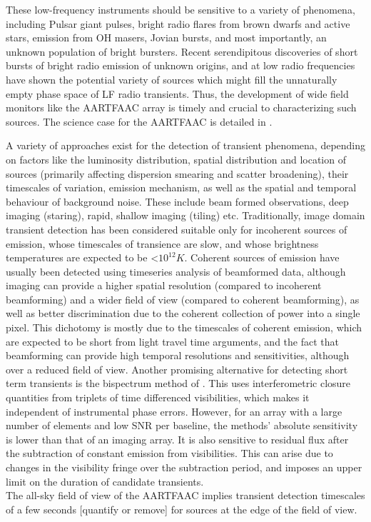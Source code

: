 \documentclass{aa}
\begin{document}
These low-frequency instruments  should be sensitive to a  variety of phenomena,
including Pulsar giant pulses, bright  radio flares from brown dwarfs and active
stars, emission from OH masers,  Jovian bursts, and most importantly, an unknown
population of bright bursters.  Recent serendipitous discoveries of short bursts
of  bright radio  emission  of unknown  origins,  and at  low radio  frequencies
\citep{lorimer2007bright,  thornton2013population}   have  shown  the  potential
variety of  sources which  might fill  the unnaturally empty  phase space  of LF
radio transients. Thus, the development of wide field monitors like the AARTFAAC
array is timely and crucial to characterizing such sources. The science case for
the AARTFAAC is detailed in \citep{wijers2013aartfaac}.

A  variety  of  approaches  exist  for the  detection  of  transient  phenomena,
depending on factors like  the luminosity distribution, spatial distribution and
location  of  sources  (primarily  affecting  dispersion  smearing  and  scatter
broadening), their timescales  of variation, emission mechanism, as  well as the
spatial and temporal  behaviour of background noise.  These  include beam formed
observations,  deep  imaging (staring),  rapid,  shallow  imaging (tiling)  etc.
Traditionally,  image domain  transient detection  has been  considered suitable
only  for incoherent  sources of  emission, whose  timescales of  transience are
slow,  and  whose  brightness  temperatures  are  expected  to  be  <$10^{12}K$.
Coherent  sources  of  emission  have  usually been  detected  using  timeseries
analysis  of beamformed  data, although  imaging  can provide  a higher  spatial
resolution  (compared to  incoherent  beamforming)  and a  wider  field of  view
(compared to coherent beamforming), as  well as better discrimination due to the
coherent collection of power into a  single pixel.  This dichotomy is mostly due
to the  timescales of  coherent emission,  which are expected  to be  short from
light  travel time arguments,  and the  fact that  beamforming can  provide high
temporal resolutions and  sensitivities, although over a reduced  field of view.
Another  promising  alternative  for  detecting  short term  transients  is  the
bispectrum  method  of \citep{law2012all}.   This  uses interferometric  closure
quantities  from  triplets of  time  differenced  visibilities,  which makes  it
independent of  instrumental phase errors.  However,  for an array  with a large
number of elements  and low SNR per baseline,  the methods' absolute sensitivity
is lower than that  of an imaging array.  It is also  sensitive to residual flux
after the  subtraction of constant  emission from visibilities.  This  can arise
due to changes in the visibility fringe over the subtraction period, and imposes
an upper limit  on the duration of candidate transients.\\  The all-sky field of
view of  the AARTFAAC  implies transient detection  timescales of a  few seconds
{[}quantify or remove{]} for sources at the edge of the field of view.
\end{document}
